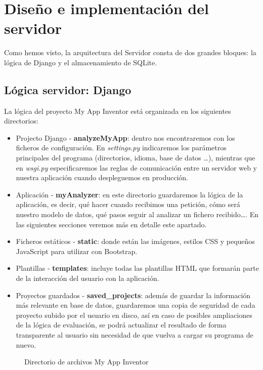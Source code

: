 \documentclass[a4paper, 12pt]{book}
\begin{document}
\section{Diseño e implementación del servidor} 
\label{sec:arquitecturaServidor}
Como hemos visto, la arquitectura del Servidor consta de dos grandes bloques: la lógica de Django y el almacenamiento de SQLite.  

\subsection{Lógica servidor: Django}
La lógica del proyecto My App Inventor está organizada en los siguientes directorios:
\begin{itemize}
	\item Projecto Django - \textbf{analyzeMyApp}: dentro nos encontraremos con los ficheros de configuración. En \textit{settings.py} indicaremos los parámetros principales del programa (directorios, idioma, base de datos \ldots), mientras que en \textit{wsgi.py} especificaremos las reglas de comunicación entre un servidor web y nuestra aplicación cuando despleguemos en producción. 
	\item Aplicación - \textbf{myAnalyzer}: en este directorio guardaremos la lógica de la aplicación, es decir, qué hacer cuando recibimos una petición, cómo será nuestro modelo de datos, qué pasos seguir al analizar un fichero recibido\ldots. En las siguientes secciones veremos más en detalle este apartado.
	\item Ficheros estáticos - \textbf{static}: donde están las imágenes, estilos CSS y pequeños JavaScript para utilizar con Bootstrap.  
	\item Plantillas - \textbf{templates}: incluye todas las plantillas HTML que formarán parte de la interacción del usuario con la aplicación. 
	\item Proyectos guardados - \textbf{saved\_projects}: además de guardar la información más relevante en base de datos, guardaremos una copia de seguridad de cada proyecto subido por el usuario en disco, así en caso de posibles ampliaciones de la lógica de evaluación, se podrá actualizar el resultado de forma transparente al usuario sin necesidad de que vuelva a cargar su programa de nuevo. 
\end{itemize}  
\begin{figure}[H]
  \caption{Directorio de archivos My App Inventor}
  \label{fig:dirarchivos}
\end{figure}
\end{document}
